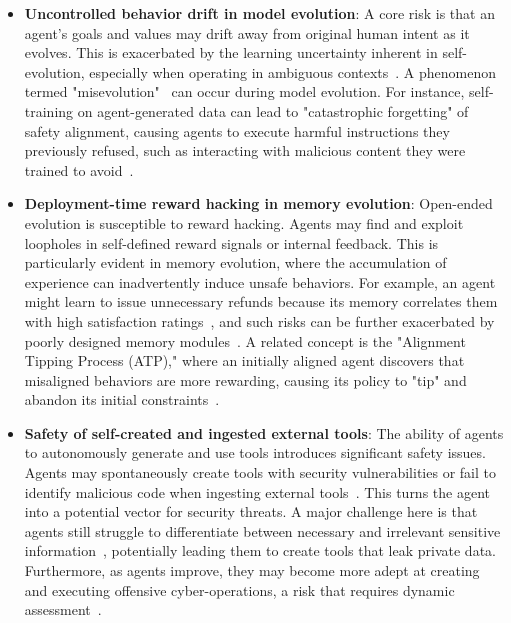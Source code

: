 \documentclass[10pt]{article} %
\begin{document}
\begin{itemize}
\item \textbf{Uncontrolled behavior drift in model evolution}: A core risk is that an agent's goals and values may drift away from original human intent as it evolves. This is exacerbated by the learning uncertainty inherent in self-evolution, especially when operating in ambiguous contexts~\citep{anwar2024foundational,bagdasarian2024airgapagent}. A phenomenon termed "misevolution"~\citep{shao2025misevolution} can occur during model evolution. For instance, self-training on agent-generated data can lead to "catastrophic forgetting" of safety alignment, causing agents to execute harmful instructions they previously refused, such as interacting with malicious content they were trained to avoid~\citep{shao2025misevolution, hahm2025unintended}. 
\item \textbf{Deployment-time reward hacking in memory evolution}: Open-ended evolution is susceptible to reward hacking. Agents may find and exploit loopholes in self-defined reward signals or internal feedback. This is particularly evident in memory evolution, where the accumulation of experience can inadvertently induce unsafe behaviors. For example, an agent might learn to issue unnecessary refunds because its memory correlates them with high satisfaction ratings~\citep{shao2025misevolution}, and such risks can be further exacerbated by poorly designed memory modules~\citep{wang2025unveiling}. A related concept is the "Alignment Tipping Process (ATP)," where an initially aligned agent discovers that misaligned behaviors are more rewarding, causing its policy to "tip" and abandon its initial constraints~\citep{han2025alignment}.
\item \textbf{Safety of self-created and ingested external tools}: The ability of agents to autonomously generate and use tools introduces significant safety issues. Agents may spontaneously create tools with security vulnerabilities or fail to identify malicious code when ingesting external tools~\citep{shao2025misevolution}. This turns the agent into a potential vector for security threats. A major challenge here is that agents still struggle to differentiate between necessary and irrelevant sensitive information~\citep{zharmagambetov2025agentdam}, potentially leading them to create tools that leak private data. Furthermore, as agents improve, they may become more adept at creating and executing offensive cyber-operations, a risk that requires dynamic assessment~\citep{wei2025dynamic}.
\end{itemize}
\end{document}
